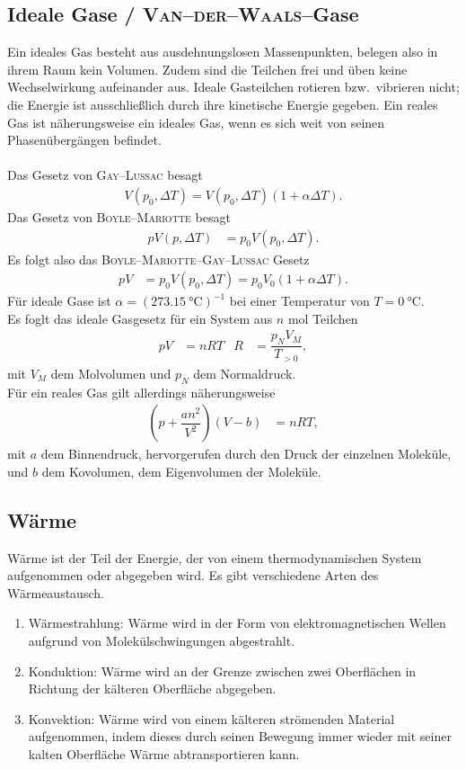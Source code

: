 \subsection{Ideale Gase / \textsc{Van--der--Waals}--Gase}
Ein ideales Gas besteht aus ausdehnungslosen Massenpunkten, belegen also in ihrem Raum kein Volumen.
Zudem sind die Teilchen frei und üben keine Wechselwirkung aufeinander aus.
Ideale Gasteilchen rotieren bzw.\ vibrieren nicht; die Energie ist ausschließlich durch ihre kinetische Energie gegeben.
Ein reales Gas ist näherungsweise ein ideales Gas, wenn es sich weit von seinen Phasenübergängen befindet.\\\\
Das Gesetz von \textsc{Gay--Lussac} besagt
\begin{align} 
        V\left(p_0,\Delta T\right)=V\left(p_0,\Delta T\right)\left(1+\alpha \Delta T\right)
.\end{align} 
Das Gesetz von \textsc{Boyle--Mariotte} besagt
\begin{align} 
        pV\left(p,\Delta T\right)&=p_0V\left(p_0,\Delta T\right)
.\end{align} 
Es folgt also das \textsc{Boyle--Mariotte--Gay--Lussac} Gesetz
\begin{align} 
        pV&=p_0V\left(p_0,\Delta T\right)=p_0V_0\left(1+\alpha \Delta T\right)
.\end{align} 
Für ideale Gase ist $\alpha =\left(\SI{273,15}{\celsius}\right)^{-1}$ bei einer Temperatur von $T=\SI{0}{\celsius}$.\\\indent
Es foglt das ideale Gasgesetz für ein System aus $n$ mol Teilchen
\begin{align} 
        pV&=nRT&R&=\dfrac{p_NV_M}{T_{>0}}
,\end{align} 
mit $V_M$ dem Molvolumen und $p_N$ dem Normaldruck.\\\indent
Für ein reales Gas gilt allerdings näherungsweise
\begin{align} 
        \left(p+\dfrac{an^2}{V^2}\right)\left(V-b\right)&=nRT
,\end{align} 
mit $a$ dem Binnendruck, hervorgerufen durch den Druck der einzelnen Moleküle, und $b$ dem Kovolumen, dem Eigenvolumen der Moleküle.

\subsection{Wärme}
Wärme ist der Teil der Energie, der von einem thermodynamischen System aufgenommen oder abgegeben wird.
Es gibt verschiedene Arten des Wärmeaustausch.
\begin{enumerate}[label=--]
        \item Wärmestrahlung: Wärme wird in der Form von elektromagnetischen Wellen aufgrund von Molekülschwingungen abgestrahlt.
        \item Konduktion: Wärme wird an der Grenze zwischen zwei Oberflächen in Richtung der kälteren Oberfläche abgegeben.
        \item Konvektion: Wärme wird von einem kälteren strömenden Material aufgenommen, indem dieses durch seinen Bewegung immer wieder mit seiner kalten Oberfläche Wärme abtransportieren kann.
\end{enumerate}

